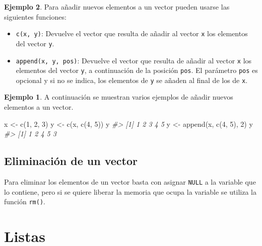 \documentclass[
]{book}
\newenvironment{Shaded}{\begin{snugshade}}{\end{snugshade}}
\newcommand{\CommentTok}[1]{\textcolor[rgb]{0.56,0.35,0.01}{\textit{#1}}}
\newcommand{\DecValTok}[1]{\textcolor[rgb]{0.00,0.00,0.81}{#1}}
\newcommand{\FunctionTok}[1]{\textcolor[rgb]{0.00,0.00,0.00}{#1}}
\newcommand{\NormalTok}[1]{#1}
\newcommand{\OtherTok}[1]{\textcolor[rgb]{0.56,0.35,0.01}{#1}}
\providecommand{\tightlist}{%
  \setlength{\itemsep}{0pt}\setlength{\parskip}{0pt}}
\theoremstyle{definition}
\theoremstyle{definition}
\newtheorem{example}{Ejemplo}[chapter]
\theoremstyle{definition}
\theoremstyle{definition}
\theoremstyle{remark}
\begin{document}
\begin{example}
Para añadir nuevos elementos a un vector pueden usarse las siguientes funciones:

\begin{itemize}
\tightlist
\item
  \texttt{c(x,\ y)}: Devuelve el vector que resulta de añadir al vector \texttt{x} los elementos del vector \texttt{y}.
\item
  \texttt{append(x,\ y,\ pos)}: Devuelve el vector que resulta de añadir al vector \texttt{x} los elementos del vector \texttt{y}, a continuación de la posición \texttt{pos}. El parámetro \texttt{pos} es opcional y si no se indica, los elementos de \texttt{y} se añaden al final de los de \texttt{x}.
\end{itemize}

\begin{example}

A continuación se muestran varios ejemplos de añadir nuevos elementos a un vector.

\begin{Shaded}
\begin{Highlighting}[]
\NormalTok{x }\OtherTok{\textless{}{-}} \FunctionTok{c}\NormalTok{(}\DecValTok{1}\NormalTok{, }\DecValTok{2}\NormalTok{, }\DecValTok{3}\NormalTok{)}
\NormalTok{y }\OtherTok{\textless{}{-}} \FunctionTok{c}\NormalTok{(x, }\FunctionTok{c}\NormalTok{(}\DecValTok{4}\NormalTok{, }\DecValTok{5}\NormalTok{))}
\NormalTok{y}
\CommentTok{\#\textgreater{} [1] 1 2 3 4 5}
\NormalTok{y }\OtherTok{\textless{}{-}} \FunctionTok{append}\NormalTok{(x, }\FunctionTok{c}\NormalTok{(}\DecValTok{4}\NormalTok{, }\DecValTok{5}\NormalTok{), }\DecValTok{2}\NormalTok{)}
\NormalTok{y}
\CommentTok{\#\textgreater{} [1] 1 2 4 5 3}
\end{Highlighting}
\end{Shaded}

\end{example}

\hypertarget{eliminaciuxf3n-de-un-vector}{%
\subsection{Eliminación de un vector}\label{eliminaciuxf3n-de-un-vector}}

Para eliminar los elementos de un vector basta con asignar \texttt{NULL} a la variable que lo contiene, pero si se quiere liberar la memoria que ocupa la variable se utiliza la función \texttt{rm()}.

\hypertarget{listas}{%
\section{Listas}\label{listas}}


\end{example}
\end{document}
